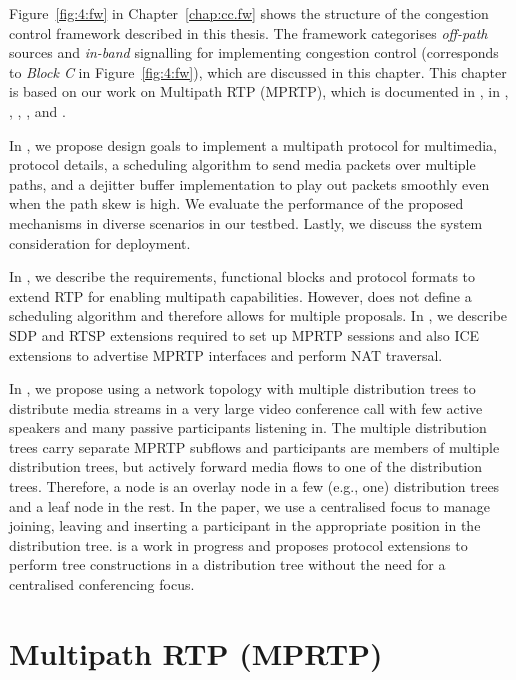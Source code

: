 Figure~\ref{fig:4:fw} in Chapter~\ref{chap:cc.fw} shows the structure of the
congestion control framework described in this thesis. The framework
categorises \emph{off-path} sources and \emph{in-band} signalling for
implementing congestion control (corresponds to \emph{Block C} in
Figure~\ref{fig:4:fw}), which are discussed in this chapter. This chapter is
based on our work on Multipath RTP (MPRTP), which is documented in
, in \cite{draft.mprtp}, \cite{draft.mprtp.sdp},
\cite{draft.mmusic.pcp.best.int}, \cite{Globisch:AsymGrpComm}, and 
\cite{draft.rtcp.overlay}.

In , we propose design goals to implement a
multipath protocol for multimedia, protocol details, a scheduling algorithm to
send media packets over multiple paths, and a dejitter buffer implementation to
play out packets smoothly even when the path skew is high. We evaluate the
performance of the proposed mechanisms in diverse scenarios in our testbed.
Lastly, we discuss the system consideration for deployment.

In \cite{draft.mprtp}, we describe the requirements, functional blocks and
protocol formats to extend RTP for enabling multipath capabilities. However,
\cite{draft.mprtp} does not define a scheduling algorithm and therefore allows 
for multiple proposals. In \cite{draft.mprtp.sdp}, we describe SDP and RTSP 
extensions required to set up MPRTP sessions and also ICE extensions to advertise 
MPRTP interfaces and perform NAT traversal.

In \cite{Globisch:AsymGrpComm}, we propose using a network topology with
multiple distribution trees to distribute media streams in a very large
video conference call with few active speakers and many passive participants
listening in. The multiple distribution trees carry separate MPRTP subflows
and participants are members of multiple distribution trees, but actively
forward media flows to one of the distribution trees. Therefore, a node is an
overlay node in a few (e.g., one) distribution trees and a leaf node in the
rest. In the paper, we use a centralised focus to manage joining, leaving
and inserting a participant in the appropriate position in the distribution
tree. \cite{draft.rtcp.overlay} is a work in progress and proposes protocol
extensions to perform tree constructions in a distribution tree without the
need for a centralised conferencing focus.


\section{Multipath RTP (MPRTP)}

